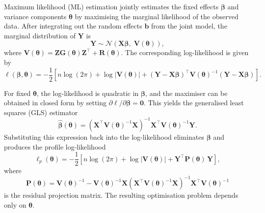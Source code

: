 \documentclass[
  letterpaper,
  DIV=11,
  numbers=noendperiod]{scrartcl}
\begin{document}
Maximum likelihood (ML) estimation jointly estimates the fixed effects
\(\symbf{\beta}\) and variance components \(\symbf{\theta}\) by
maximising the marginal likelihood of the observed data. After
integrating out the random effects \(\symbf{b}\) from the joint model,
the marginal distribution of \(\symbf{Y}\) is \begin{equation}
\symbf{Y} \sim \mathcal{N}\!\left(\symbf{X}\symbf{\beta},\; \symbf{V}(\symbf{\theta})\right),
\end{equation} where
\(\symbf{V}(\symbf{\theta}) = \symbf{Z}\symbf{G}(\symbf{\theta})\symbf{Z}^\top + \symbf{R}(\symbf{\theta})\).
The corresponding log-likelihood is given by \begin{equation}
\ell(\symbf{\beta}, \symbf{\theta})
=
-\frac{1}{2}\left[
n\log(2\pi)
+ \log\left|\symbf{V}(\symbf{\theta})\right|
+ (\symbf{Y} - \symbf{X}\symbf{\beta})^\top
\symbf{V}(\symbf{\theta})^{-1}
(\symbf{Y} - \symbf{X}\symbf{\beta})
\right].
\end{equation}

For fixed \(\symbf{\theta}\), the log-likelihood is quadratic in
\(\symbf{\beta}\), and the maximiser can be obtained in closed form by
setting \(\partial \ell / \partial \symbf{\beta} = \symbf{0}\). This
yields the generalised least squares (GLS) estimator \begin{equation}
\widehat{\symbf{\beta}}(\symbf{\theta})
=
\left(
\symbf{X}^\top \symbf{V}(\symbf{\theta})^{-1} \symbf{X}
\right)^{-1}
\symbf{X}^\top \symbf{V}(\symbf{\theta})^{-1} \symbf{Y}.
\end{equation} Substituting this expression back into the log-likelihood
eliminates \(\symbf{\beta}\) and produces the profile log-likelihood
\begin{equation}
\ell_p(\symbf{\theta})
=
-\frac{1}{2}\left[
n\log(2\pi)
+ \log\left|\symbf{V}(\symbf{\theta})\right|
+ \symbf{Y}^\top \symbf{P}(\symbf{\theta})\, \symbf{Y}
\right],
\end{equation} where \begin{equation}
\symbf{P}(\symbf{\theta})
=
\symbf{V}(\symbf{\theta})^{-1}
-
\symbf{V}(\symbf{\theta})^{-1}\symbf{X}
\left(
\symbf{X}^\top\symbf{V}(\symbf{\theta})^{-1}\symbf{X}
\right)^{-1}
\symbf{X}^\top\symbf{V}(\symbf{\theta})^{-1}
\end{equation} is the residual projection matrix. The resulting
optimisation problem depends only on \(\symbf{\theta}\).
\end{document}
